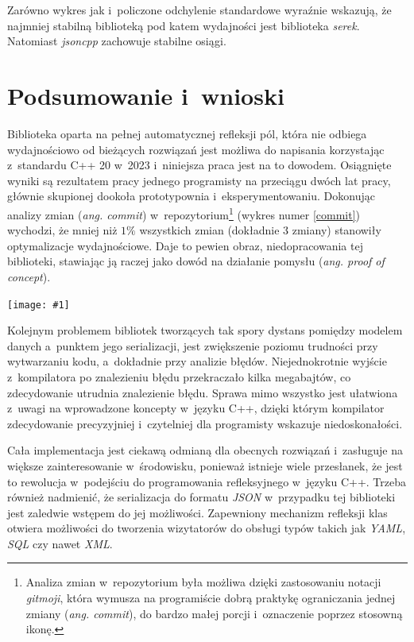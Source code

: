 \documentclass[12pt]{article}
\newcommand{\n}{\newline}
\newcommand{\putfig}[3]{
\begin{captioned}[H]
	\centering
	\texttt{[image: \#1]}
	\caption{#2}
	\label{#3}
	\medskip
\end{captioned}
}
\newcommand{\nonpl}[1]{{\it #1}}
\newcommand{\ang}[1]{\nonpl{ang. #1}}
\newcommand{\JSON}{\nonpl{JSON} }
\newcommand{\serek}{\nonpl{serek}}
\begin{document}
{{{				Zarówno wykres jak i~policzone odchylenie standardowe wyraźnie wskazują, że najmniej stabilną biblioteką pod katem wydajności jest biblioteka \serek.
				Natomiast \nonpl{jsoncpp} zachowuje stabilne osiągi.
			}
		}

		{
			\section{Podsumowanie i~wnioski}

			Biblioteka oparta na pełnej automatycznej refleksji pól, która nie odbiega wydajnościowo od bieżących rozwiązań jest możliwa do napisania korzystając
			z~standardu C++ 20 w~2023 i~niniejsza praca jest na to dowodem. Osiągnięte wyniki są rezultatem pracy jednego programisty na przeciągu dwóch lat
			pracy, głównie skupionej dookoła prototypownia i~eksperymentowaniu. Dokonując analizy zmian (\ang{commit}) w~repozytorium\footnote{
				Analiza zmian w~repozytorium była możliwa dzięki zastosowaniu notacji \nonpl{gitmoji}\cite{gitmoji}, która wymusza na programiście dobrą praktykę
				ograniczania jednej zmiany (\ang{commit}), do bardzo małej porcji i~oznaczenie poprzez stosowną ikonę.
			} (wykres numer \ref{commit}) wychodzi, że mniej niż $1\%$ wszystkich zmian (dokładnie $3$ zmiany) stanowiły optymalizacje wydajnościowe. Daje to pewien obraz,
			niedopracowania tej biblioteki, stawiając ją raczej jako dowód na działanie pomysłu (\ang{proof of concept}).\n

			\putfig{./charts/pre_generated_charts/commit_percentage.png}{Udział rodzajów zmian w~całym repozytorium \serek}{commit}

			\newpage

			Kolejnym problemem bibliotek tworzących tak spory dystans pomiędzy modelem danych a~punktem jego serializacji, jest zwiększenie poziomu trudności
			przy wytwarzaniu kodu, a~dokładnie przy analizie błędów. Niejednokrotnie wyjście z~kompilatora po znalezieniu błędu przekraczało kilka megabajtów,
			co zdecydowanie utrudnia znalezienie błędu. Sprawa mimo wszystko jest ułatwiona z~uwagi na wprowadzone koncepty w~języku C++, dzięki którym kompilator
			zdecydowanie precyzyjniej i~czytelniej dla programisty wskazuje niedoskonałości.\n

			Cała implementacja jest ciekawą odmianą dla obecnych rozwiązań i~zasługuje na większe zainteresowanie w~środowisku, ponieważ istnieje wiele przesłanek, że
			jest to rewolucja w~podejściu do programowania refleksyjnego w~języku C++. Trzeba również nadmienić, że serializacja do formatu \JSON w~przypadku tej biblioteki
			jest zaledwie wstępem do jej możliwości. Zapewniony mechanizm refleksji klas otwiera możliwości do tworzenia wizytatorów do obsługi typów takich jak \nonpl{YAML}, \nonpl{SQL}
			czy nawet \nonpl{XML}.
		}
	}
\end{document}
